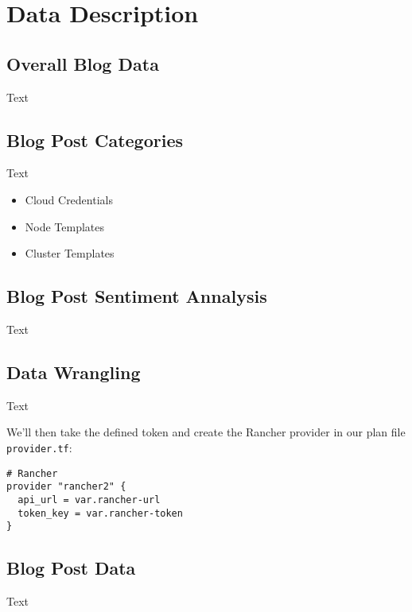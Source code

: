%
%

\pagebreak
\section{Data Description}

\onehalfspacing

\subsection{Overall Blog Data}

Text

\subsection{Blog Post Categories}

Text

\begin{itemize}
\item Cloud Credentials
\item Node Templates
\item Cluster Templates
\end{itemize}

\subsection{Blog Post Sentiment Annalysis}

Text

\subsection{Data Wrangling}

Text

We'll then take the defined token and create the Rancher provider in our plan file \verb|provider.tf|:

\begin{lstlisting}[caption=Rancher Provider, frame=single, basicstyle=\ttfamily]
# Rancher
provider "rancher2" {
  api_url = var.rancher-url
  token_key = var.rancher-token
}
\end{lstlisting}

\subsection{Blog Post Data}

Text

